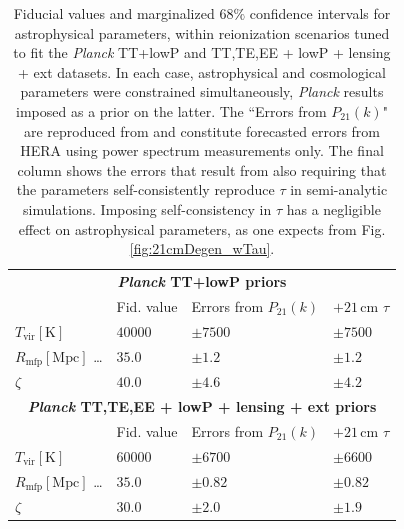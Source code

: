 \documentclass[twocolumn,aps,prd,nofootinbib,showpacs,superscriptaddress]{revtex4-1}
\begin{document}
\begin{table}
\caption{\label{tab:AstroParams} Fiducial values and marginalized $68\%$ confidence intervals for astrophysical parameters, within reionization scenarios tuned to fit the \emph{Planck} TT+lowP and TT,TE,EE + lowP + lensing + ext datasets. In each case, astrophysical and cosmological parameters were constrained simultaneously, \emph{Planck} results imposed as a prior on the latter. The ``Errors from $P_{21}(k)$" are reproduced from \cite{Liu_in_prep} and constitute forecasted errors from HERA using power spectrum measurements only. The final column shows the errors that result from also requiring that the parameters self-consistently reproduce $\tau$ in semi-analytic simulations. Imposing self-consistency in $\tau$ has a negligible effect on astrophysical parameters, as one expects from Fig. \ref{fig:21cmDegen_wTau}.}
\begin{ruledtabular}
\begin{tabular}{llll}
\multicolumn{4}{c}{   \textbf{\emph{Planck} TT+lowP priors} }  \\
& Fid. value & Errors from  $P_{21} (k)$ & $+21\,\textrm{cm}$ $\tau$\\
\hline
$T_\textrm{vir}\left[ \textrm{K} \right]$  \dotfill & $40000$ & $\pm 7500$ & $\pm 7500$ \\
 $R_\textrm{mfp}\left[ \textrm{Mpc} \right]$ \dots \dotfill & $35.0$ & $\pm1.2$ & $\pm1.2$ \\
$\zeta$ \dotfill& $40.0$ & $\pm 4.6$ & $\pm 4.2$ \\
\hline 
\multicolumn{4}{c}{    \textbf{\emph{Planck} TT,TE,EE + lowP + lensing + ext priors} }  \\
& Fid. value & Errors from  $P_{21} (k)$  & $+21\,\textrm{cm}$ $\tau$\\
\hline
$T_\textrm{vir}\left[ \textrm{K} \right]$  \dotfill & $60000$ & $\pm 6700$ & $\pm 6600$ \\
$R_\textrm{mfp}\left[ \textrm{Mpc} \right]$ \dots \dotfill & $35.0$ & $\pm 0.82$ & $\pm 0.82$ \\
$\zeta$ \dotfill& $30.0$ & $\pm 2.0$ & $\pm 1.9$\\
\end{tabular}
\end{ruledtabular}
\end{table}
\end{document}
